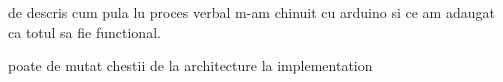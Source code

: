 \label{chap:impl}


de descris cum pula lu proces verbal m-am chinuit cu arduino si ce am adaugat ca totul sa fie
functional.

poate de mutat chestii de la architecture la implementation
